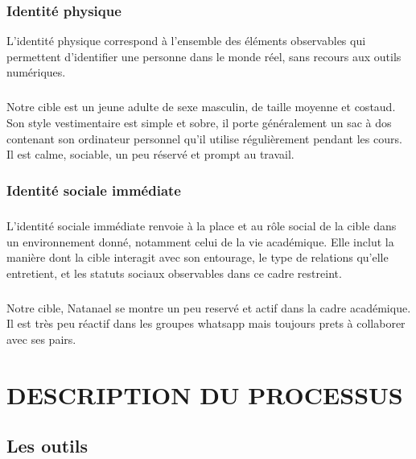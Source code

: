 \documentclass[memoire,12pt]{report}
\begin{document}
 \subsection{Identité physique}
 L'identité physique correspond  à l'ensemble des éléments observables qui permettent d'identifier une personne dans le monde réel, sans recours aux outils numériques. 
\paragraph{}Notre cible est un jeune adulte de sexe masculin, de taille moyenne et costaud. Son style vestimentaire est simple et sobre, il porte généralement un sac à dos contenant son ordinateur personnel qu'il utilise régulièrement pendant les cours. Il est calme, sociable, un peu réservé et prompt au travail. 
 \subsection{Identité sociale immédiate}
 \paragraph{}L’identité sociale immédiate renvoie à la place et au rôle social de la cible dans un environnement donné, notamment celui de la vie académique. Elle inclut la manière dont la cible interagit avec son entourage, le type de relations qu’elle entretient, et les statuts sociaux observables dans ce cadre restreint.
 \paragraph{}Notre cible, Natanael se montre un peu reservé et actif dans la cadre académique. Il est très peu réactif dans les groupes whatsapp mais toujours prets à collaborer avec ses pairs. 
\chapter{DESCRIPTION DU PROCESSUS}
 \section{Les outils}
\end{document}

